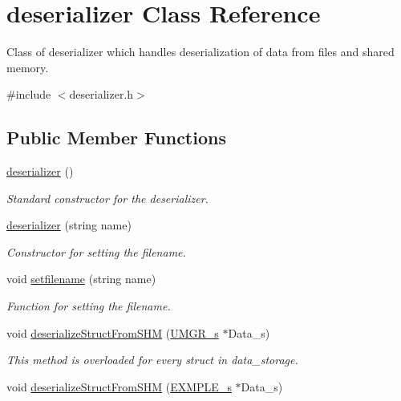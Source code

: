 \hypertarget{classdeserializer}{}\section{deserializer Class Reference}
\label{classdeserializer}


Class of deserializer which handles deserialization of data from files and shared memory.  




{\ttfamily \#include $<$deserializer.\+h$>$}

\subsection*{Public Member Functions}
\begin{DoxyCompactItemize}
\item 
\hyperlink{classdeserializer_a68472d705e664b102e5ae2dabf1f4725}{deserializer} ()
\begin{DoxyCompactList}\small\item\em Standard constructor for the deserializer. \end{DoxyCompactList}\item 
\hyperlink{classdeserializer_a3d9141cd090ad5f52e0d2baed0764ebf}{deserializer} (string name)
\begin{DoxyCompactList}\small\item\em Constructor for setting the filename. \end{DoxyCompactList}\item 
void \hyperlink{classdeserializer_a5d20cd8a970098ce2bb6473c2eccfddf}{setfilename} (string name)
\begin{DoxyCompactList}\small\item\em Function for setting the filename. \end{DoxyCompactList}\item 
void \hyperlink{classdeserializer_a551670afd582e6223efe33f8915dff68}{deserialize\+Struct\+From\+S\+HM} (\hyperlink{structUMGR__s}{U\+M\+G\+R\+\_\+s} $\ast$Data\+\_\+s)
\begin{DoxyCompactList}\small\item\em This method is overloaded for every struct in data\+\_\+storage. \end{DoxyCompactList}\item 
void \hyperlink{classdeserializer_a759537748db65f231bf04372efe3253c}{deserialize\+Struct\+From\+S\+HM} (\hyperlink{structEXMPLE__s}{E\+X\+M\+P\+L\+E\+\_\+s} $\ast$Data\+\_\+s)

\end{DoxyCompactItemize}
